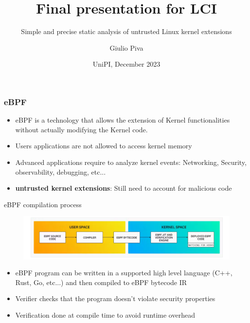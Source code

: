 \documentclass[aspectratio=169]{beamer}
\title[Final presentation for CS4280] %
{Final presentation for LCI}
\subtitle{Simple and precise static analysis of untrusted Linux kernel extensions}
\author[]
{Giulio Piva}
\date[VLC 2021] %
{UniPI, December 2023}
\begin{document}
\frame{\titlepage}
\begin{frame}
  \frametitle{eBPF}

  \begin{figure}
    \centering

  \end{figure}

  \begin{itemize}
    \item eBPF is a technology that allows the extension of Kernel functionalities
          without actually modifying the Kernel code.
    \item Users applications are not allowed to access kernel memory
    \item Advanced applications require to analyze kernel events:
          Networking, Security, observability, debugging, etc...
    \item \textbf{untrusted kernel extensions}: Still need to account for malicious code
  \end{itemize}
  \begin{figure}
    \centering
  \end{figure}
\end{frame}


\begin{frame}{eBPF compilation process}
  \begin{figure}
    \centering
    \includegraphics[width=\textwidth]{images/ebpf-overview.png}
  \end{figure}
  \begin{itemize}
    \item eBPF program can be written in a supported high level language (C++, Rust, Go, etc...)
    and then compiled to eBPF bytecode IR
    \item Verifier checks that the program doesn't violate security properties
    \item Verification done at compile time to avoid runtime overhead
  \end{itemize}
\end{frame}
\end{document}

